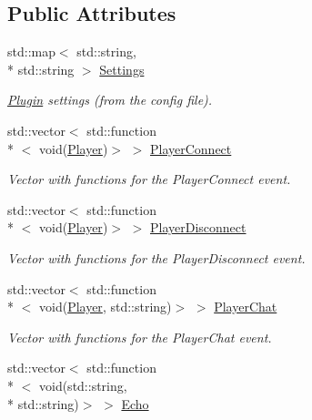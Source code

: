 \subsection*{Public Attributes}
\begin{DoxyCompactItemize}
\item 
\hypertarget{classPlugin_a3ebbb5535520c01fb815ba2f1a7a14e3}{std\-::map$<$ std\-::string, \\*
std\-::string $>$ \hyperlink{classPlugin_a3ebbb5535520c01fb815ba2f1a7a14e3}{Settings}}\label{classPlugin_a3ebbb5535520c01fb815ba2f1a7a14e3}

\begin{DoxyCompactList}\small\item\em \hyperlink{classPlugin}{Plugin} settings (from the config file). \end{DoxyCompactList}\item 
\hypertarget{classPlugin_a02e032f548c5a002496ab6b02788342b}{std\-::vector$<$ std\-::function\\*
$<$ void(\hyperlink{structPlayer}{Player})$>$ $>$ \hyperlink{classPlugin_a02e032f548c5a002496ab6b02788342b}{Player\-Connect}}\label{classPlugin_a02e032f548c5a002496ab6b02788342b}

\begin{DoxyCompactList}\small\item\em Vector with functions for the Player\-Connect event. \end{DoxyCompactList}\item 
\hypertarget{classPlugin_a3c8dec90190a888e951268b3727b7573}{std\-::vector$<$ std\-::function\\*
$<$ void(\hyperlink{structPlayer}{Player})$>$ $>$ \hyperlink{classPlugin_a3c8dec90190a888e951268b3727b7573}{Player\-Disconnect}}\label{classPlugin_a3c8dec90190a888e951268b3727b7573}

\begin{DoxyCompactList}\small\item\em Vector with functions for the Player\-Disconnect event. \end{DoxyCompactList}\item 
\hypertarget{classPlugin_aa88b75d9b344326bc2ea4ac599f2c501}{std\-::vector$<$ std\-::function\\*
$<$ void(\hyperlink{structPlayer}{Player}, std\-::string)$>$ $>$ \hyperlink{classPlugin_aa88b75d9b344326bc2ea4ac599f2c501}{Player\-Chat}}\label{classPlugin_aa88b75d9b344326bc2ea4ac599f2c501}

\begin{DoxyCompactList}\small\item\em Vector with functions for the Player\-Chat event. \end{DoxyCompactList}\item 
\hypertarget{classPlugin_a427a43a87266e448d5543219a9fd26a2}{std\-::vector$<$ std\-::function\\*
$<$ void(std\-::string, \\*
std\-::string)$>$ $>$ \hyperlink{classPlugin_a427a43a87266e448d5543219a9fd26a2}{Echo}}\label{classPlugin_a427a43a87266e448d5543219a9fd26a2}


\end{DoxyCompactItemize}
